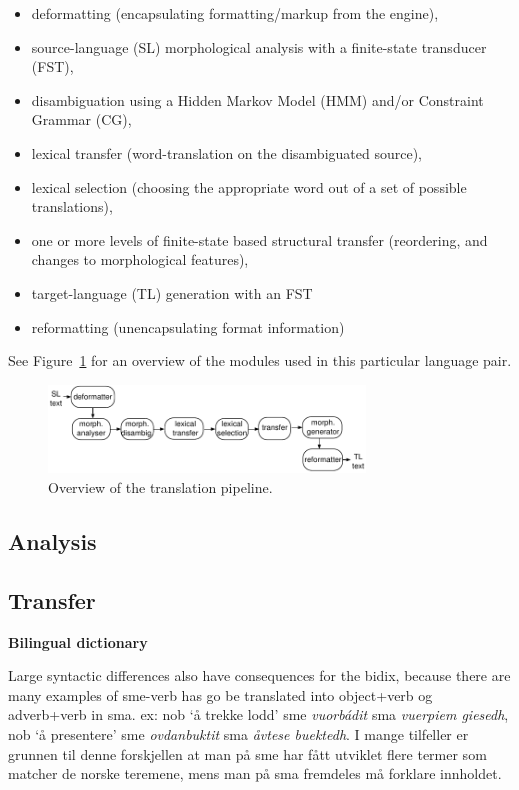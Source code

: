 \documentclass[a4paper,11pt,twocolumn]{article}
\begin{document}
\begin{itemize}
\item deformatting (encapsulating formatting/markup from the engine),
\item source-language (SL) morphological analysis with a finite-state
  transducer (FST),
\item disambiguation using a Hidden Markov Model (HMM) and/or
  Constraint Grammar (CG), 
\item lexical transfer (word-translation on the disambiguated source),
\item lexical selection (choosing the appropriate word out of a set of possible
   translations),
\item one or more levels of finite-state based structural transfer
  (reordering, and changes to morphological features),
\item target-language (TL) generation with an FST
\item reformatting (unencapsulating format information)
\end{itemize}

See Figure~\ref{fig:pipeline} for an overview of the modules used
in this particular language pair.

\begin{figure}
 \centering
 \includegraphics[width=0.75\textwidth]{architecture-overview.pdf}
 \caption{Overview of the translation pipeline.}
 \label{fig:pipeline}
\end{figure}

\subsection{Analysis}

\subsection{Transfer}

\textbf{Bilingual dictionary}

Large syntactic differences also have consequences for the bidix, because there are many examples of sme-verb has go be translated into object+verb og adverb+verb in sma.
ex: nob `å trekke lodd' sme \textit{vuorbádit} sma \textit{vuerpiem giesedh}, 
nob `å presentere' sme \textit{ovdanbuktit} sma \textit{åvtese buektedh}. 
I mange tilfeller er grunnen til denne  forskjellen at man på sme har fått utviklet flere termer som matcher de norske teremene, mens man på sma
fremdeles må forklare innholdet.
\end{document}
